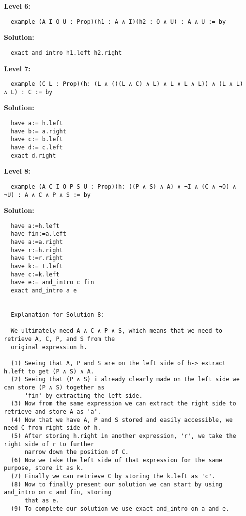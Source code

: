 \documentclass{article}
\theoremstyle{theorem}
\theoremstyle{definition}
\theoremstyle{remark}
\begin{document}
\begin{enumerate}
  \textbf{Level 6:}
  \begin{verbatim}
  example (A I O U : Prop)(h1 : A ∧ I)(h2 : O ∧ U) : A ∧ U := by
  \end{verbatim}

  \textbf{Solution:}
  \begin{verbatim}
  exact and_intro h1.left h2.right
  \end{verbatim}

  \textbf{Level 7:}
  \begin{verbatim}
  example (C L : Prop)(h: (L ∧ (((L ∧ C) ∧ L) ∧ L ∧ L ∧ L)) ∧ (L ∧ L) ∧ L) : C := by
  \end{verbatim}

  \textbf{Solution:}
  \begin{verbatim}
  have a:= h.left
  have b:= a.right
  have c:= b.left
  have d:= c.left
  exact d.right
  \end{verbatim}

  \textbf{Level 8:}
  \begin{verbatim}
  example (A C I O P S U : Prop)(h: ((P ∧ S) ∧ A) ∧ ¬I ∧ (C ∧ ¬O) ∧ ¬U) : A ∧ C ∧ P ∧ S := by
  \end{verbatim}

  \textbf{Solution:}
  \begin{verbatim}
  have a:=h.left
  have fin:=a.left
  have a:=a.right
  have r:=h.right
  have t:=r.right
  have k:= t.left
  have c:=k.left
  have e:= and_intro c fin
  exact and_intro a e
  

  Explanation for Solution 8: 

  We ultimately need A ∧ C ∧ P ∧ S, which means that we need to retrieve A, C, P, and S from the 
  original expression h. 

  (1) Seeing that A, P and S are on the left side of h-> extract h.left to get (P ∧ S) ∧ A.
  (2) Seeing that (P ∧ S) i already clearly made on the left side we can store (P ∧ S) together as 
      'fin' by extracting the left side.
  (3) Now from the same expression we can extract the right side to retrieve and store A as 'a'.
  (4) Now that we have A, P and S stored and easily accessible, we need C from right side of h.
  (5) After storing h.right in another expression, 'r', we take the right side of r to further 
      narrow down the position of C.
  (6) Now we take the left side of that expression for the same purpose, store it as k.
  (7) Finally we can retrieve C by storing the k.left as 'c'.
  (8) Now to finally present our solution we can start by using and_intro on c and fin, storing 
      that as e.
  (9) To complete our solution we use exact and_intro on a and e.


  \end{verbatim}
\end{enumerate}
\end{document}
